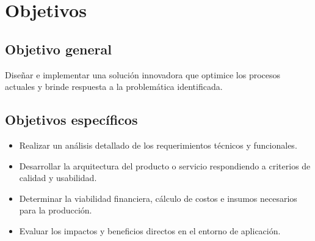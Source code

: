 \section{Objetivos}
\label{sec:objetivos}

\subsection{Objetivo general}
Diseñar e implementar una solución innovadora que optimice los procesos actuales y brinde respuesta a la problemática identificada.

\subsection{Objetivos específicos}
\begin{itemize}
    \item Realizar un análisis detallado de los requerimientos técnicos y funcionales.
    \item Desarrollar la arquitectura del producto o servicio respondiendo a criterios de calidad y usabilidad.
    \item Determinar la viabilidad financiera, cálculo de costos e insumos necesarios para la producción.
    \item Evaluar los impactos y beneficios directos en el entorno de aplicación.
\end{itemize}
